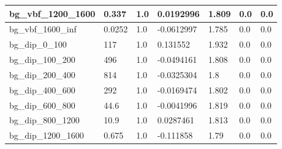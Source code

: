 \documentclass[a4paper, 10pt]{article}
\begin{document}
\begin{table}[H]
\begin{center}
\begin{tabular}{|m{23.0mm}|m{23.0mm}|m{18.0mm}|m{19.0mm}|m{19.0mm}|m{19.0mm}|m{19.0mm}|}
      \hline
      {\cellcolor{white}         bg\_vbf\_1200\_1600}& {\cellcolor{white}         0.337}& {\cellcolor{white}         1.0}& {\cellcolor{white}         0.0192996}& {\cellcolor{white}         1.809}& {\cellcolor{green}         0.0}& {\cellcolor{green}         0.0}\\
      \hline
      {\cellcolor{white}         bg\_vbf\_1600\_inf}& {\cellcolor{white}         0.0252}& {\cellcolor{white}         1.0}& {\cellcolor{white}         -0.0612997}& {\cellcolor{white}         1.785}& {\cellcolor{green}         0.0}& {\cellcolor{green}         0.0}\\
      \hline
      {\cellcolor{white}         bg\_dip\_0\_100}& {\cellcolor{white}         117}& {\cellcolor{white}         1.0}& {\cellcolor{white}         0.131552}& {\cellcolor{white}         1.932}& {\cellcolor{green}         0.0}& {\cellcolor{green}         0.0}\\
      \hline
      {\cellcolor{white}         bg\_dip\_100\_200}& {\cellcolor{white}         496}& {\cellcolor{white}         1.0}& {\cellcolor{white}         -0.0494161}& {\cellcolor{white}         1.808}& {\cellcolor{green}         0.0}& {\cellcolor{green}         0.0}\\
      \hline
      {\cellcolor{white}         bg\_dip\_200\_400}& {\cellcolor{white}         814}& {\cellcolor{white}         1.0}& {\cellcolor{white}         -0.0325304}& {\cellcolor{white}         1.8}& {\cellcolor{green}         0.0}& {\cellcolor{green}         0.0}\\
      \hline
      {\cellcolor{white}         bg\_dip\_400\_600}& {\cellcolor{white}         292}& {\cellcolor{white}         1.0}& {\cellcolor{white}         -0.0169474}& {\cellcolor{white}         1.802}& {\cellcolor{green}         0.0}& {\cellcolor{green}         0.0}\\
      \hline
      {\cellcolor{white}         bg\_dip\_600\_800}& {\cellcolor{white}         44.6}& {\cellcolor{white}         1.0}& {\cellcolor{white}         -0.0041996}& {\cellcolor{white}         1.819}& {\cellcolor{green}         0.0}& {\cellcolor{green}         0.0}\\
      \hline
      {\cellcolor{white}         bg\_dip\_800\_1200}& {\cellcolor{white}         10.9}& {\cellcolor{white}         1.0}& {\cellcolor{white}         0.0287461}& {\cellcolor{white}         1.813}& {\cellcolor{green}         0.0}& {\cellcolor{green}         0.0}\\
      \hline
      {\cellcolor{white}         bg\_dip\_1200\_1600}& {\cellcolor{white}         0.675}& {\cellcolor{white}         1.0}& {\cellcolor{white}         -0.111858}& {\cellcolor{white}         1.79}& {\cellcolor{green}         0.0}& {\cellcolor{green}         0.0}\\

\end{tabular}
\end{center}
\end{table}
\end{document}
